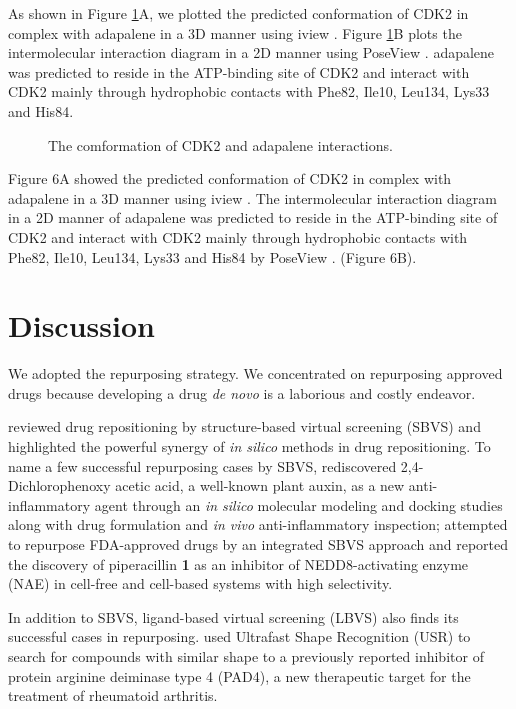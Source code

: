 As shown in Figure \ref{cdk2:Figure6}A, we plotted the predicted conformation of CDK2 in complex with adapalene in a 3D manner using iview \citep{1366}. Figure \ref{cdk2:Figure6}B plots the intermolecular interaction diagram in a 2D manner using PoseView \citep{748}. adapalene was predicted to reside in the ATP-binding site of CDK2 and interact with CDK2 mainly through hydrophobic contacts with Phe82, Ile10, Leu134, Lys33 and His84.

\begin{figure}
\centering
\caption{The comformation of CDK2 and adapalene interactions.}
\label{cdk2:Figure6}
\end{figure}
Figure 6A showed the predicted conformation of CDK2 in complex with adapalene in a 3D manner using iview \citep{1366}. The intermolecular interaction diagram in a 2D manner of adapalene was predicted to reside in the ATP-binding site of CDK2 and interact with CDK2 mainly through hydrophobic contacts with Phe82, Ile10, Leu134, Lys33 and His84 by PoseView \citep{748}. (Figure 6B).


\section{Discussion}

We adopted the repurposing strategy. We concentrated on repurposing approved drugs \citep{1023,944} because developing a drug \textit{de novo} is a laborious and costly endeavor.

\citep{1384} reviewed drug repositioning by structure-based virtual screening (SBVS) and highlighted the powerful synergy of \textit{in silico} methods in drug repositioning. To name a few successful repurposing cases by SBVS, \citep{1507} rediscovered 2,4-Dichlorophenoxy acetic acid, a well-known plant auxin, as a new anti-inflammatory agent through an \textit{in silico} molecular modeling and docking studies along with drug formulation and \textit{in vivo} anti-inflammatory inspection; \citep{1506} attempted to repurpose FDA-approved drugs by an integrated SBVS approach and reported the discovery of piperacillin \textbf{1} as an inhibitor of NEDD8-activating enzyme (NAE) in cell-free and cell-based systems with high selectivity.

In addition to SBVS, ligand-based virtual screening (LBVS) also finds its successful cases in repurposing. \citep{1504} used Ultrafast Shape Recognition (USR) \citep{1379} to search for compounds with similar shape to a previously reported inhibitor of protein arginine deiminase type 4 (PAD4), a new therapeutic target for the treatment of rheumatoid arthritis.

